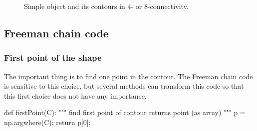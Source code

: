 \begin{figure}[htbp]
 \centering
 
 \hfill
 \hfill
 \caption{Simple object and its contours in 4- or 8-connectivity.}
 \label{fig:freeman:python:sampleimage}
\end{figure}

\subsection{Freeman chain code}
\subsubsection{First point of the shape}
The important thing is to find one point in the contour. The Freeman chain code is sensitive to this choice, but several methods can transform this code so that this first choice does not have any importance.

\begin{python}
def firstPoint(C):
    """
    find first point of contour
    returns point (as array)
    """
    p = np.argwhere(C);
    return p[0];
\end{python}

